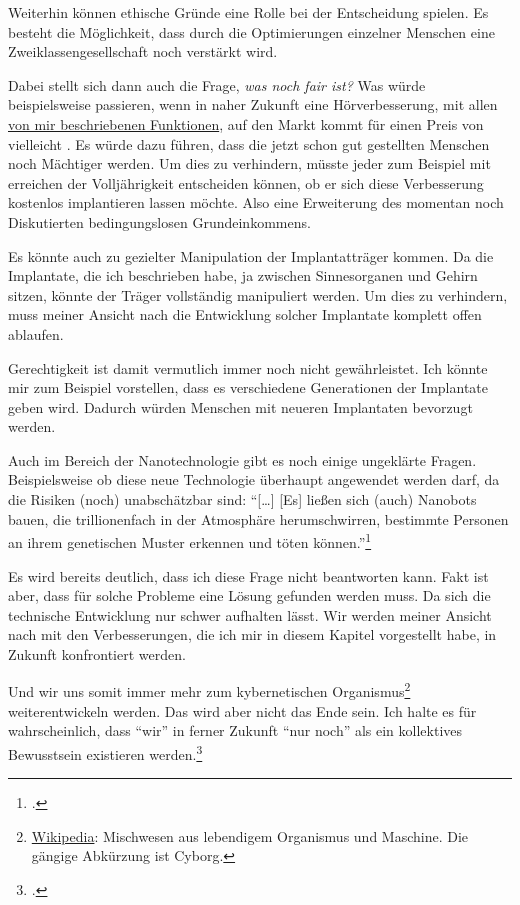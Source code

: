 Weiterhin können ethische Gründe eine Rolle bei der Entscheidung spielen. Es besteht die
Möglichkeit, dass durch die Optimierungen einzelner Menschen eine Zweiklassengesellschaft noch
verstärkt wird.

Dabei stellt sich dann auch die Frage, \emph{was noch fair ist?} Was würde beispielsweise passieren,
wenn in
naher Zukunft eine Hörverbesserung, mit allen \hyperref[sec:Robin:future:hearing]{von mir
beschriebenen Funktionen}, auf den Markt kommt für einen Preis von vielleicht . Es würde
dazu führen, dass die jetzt schon gut gestellten Menschen noch Mächtiger werden. Um dies zu
verhindern, müsste jeder zum Beispiel mit erreichen der Volljährigkeit entscheiden können, ob er sich
diese Verbesserung kostenlos implantieren lassen möchte. Also eine Erweiterung des momentan noch
Diskutierten bedingungslosen Grundeinkommens.

\begin{comment}
Eine weitere Frage ist, bis wann wir noch als Menschen zählen?
„Ist man noch ein Mensch, wenn man den Teil im Gehirn abgeschaltet hat, der für Schuldgefühle
zuständig ist?“\footcite{23C3:body_hacking}
\end{comment}

Es könnte auch zu gezielter Manipulation der Implantatträger kommen. Da die Implantate, die ich
beschrieben habe, ja zwischen Sinnesorganen und Gehirn sitzen, könnte der Träger vollständig
manipuliert werden. Um dies zu verhindern, muss meiner Ansicht nach die Entwicklung solcher
Implantate komplett offen ablaufen.

Gerechtigkeit ist damit vermutlich immer noch nicht gewährleistet. Ich könnte mir zum Beispiel
vorstellen, dass es verschiedene Generationen der Implantate geben wird. Dadurch würden Menschen mit
neueren Implantaten bevorzugt werden.

Auch im Bereich der Nanotechnologie gibt es noch einige ungeklärte Fragen. Beispielsweise ob diese
neue Technologie überhaupt angewendet werden darf, da die Risiken (noch) unabschätzbar sind:
\enquote{[\dots] [Es] ließen sich (auch) Nanobots bauen, die trillionenfach in der Atmosphäre
herumschwirren, bestimmte Personen an ihrem genetischen Muster erkennen und töten
können.}\footcite[13]{Heise:Telepolis:Mensch:Unsterblichkeit}

Es wird bereits deutlich, dass ich diese Frage nicht beantworten kann. Fakt ist aber, dass für solche
Probleme eine Lösung gefunden werden muss. Da sich die technische Entwicklung nur schwer aufhalten
lässt. Wir werden meiner Ansicht nach mit den Verbesserungen, die ich mir in diesem Kapitel
vorgestellt habe, in Zukunft konfrontiert werden.

Und wir uns somit immer mehr zum kybernetischen
Organismus\footnote{\href{http://de.wikipedia.org/wiki/Cyborg}{Wikipedia}: Mischwesen aus lebendigem
Organismus und Maschine. Die gängige Abkürzung ist Cyborg.} weiterentwickeln werden.
Das wird aber nicht das Ende sein. Ich halte es für wahrscheinlich, dass \enquote{wir} in ferner
Zukunft \enquote{nur noch} als ein kollektives Bewusstsein
existieren werden.\footcite{Heise:Telepolis:Mensch:globales_Gehirn}
